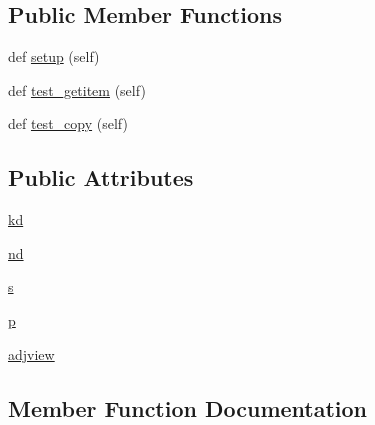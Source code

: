 \subsection*{Public Member Functions}
\begin{DoxyCompactItemize}
\item 
def \hyperlink{classnetworkx_1_1classes_1_1tests_1_1test__coreviews_1_1TestUnionMultiAdjacency_a4eed77e274d845abe9caea89699023b2}{setup} (self)
\item 
def \hyperlink{classnetworkx_1_1classes_1_1tests_1_1test__coreviews_1_1TestUnionMultiAdjacency_a1b3d33fcf85b953cb506f97f8c8a81dc}{test\+\_\+getitem} (self)
\item 
def \hyperlink{classnetworkx_1_1classes_1_1tests_1_1test__coreviews_1_1TestUnionMultiAdjacency_ab412f11245e9996f5942c3bdb4278aec}{test\+\_\+copy} (self)
\end{DoxyCompactItemize}
\subsection*{Public Attributes}
\begin{DoxyCompactItemize}
\item 
\hyperlink{classnetworkx_1_1classes_1_1tests_1_1test__coreviews_1_1TestUnionMultiAdjacency_a728e189fe2b8cae483b1bb06355f9acc}{kd}
\item 
\hyperlink{classnetworkx_1_1classes_1_1tests_1_1test__coreviews_1_1TestUnionMultiAdjacency_a8ba7bc8e8245c0966adde4ac86a34524}{nd}
\item 
\hyperlink{classnetworkx_1_1classes_1_1tests_1_1test__coreviews_1_1TestUnionMultiAdjacency_a087447b15654affd020373d2756dd403}{s}
\item 
\hyperlink{classnetworkx_1_1classes_1_1tests_1_1test__coreviews_1_1TestUnionMultiAdjacency_a4b272cf0060e3bf52f5718c40d774aeb}{p}
\item 
\hyperlink{classnetworkx_1_1classes_1_1tests_1_1test__coreviews_1_1TestUnionMultiAdjacency_ab55ab864183693aa03500853a94852b4}{adjview}
\end{DoxyCompactItemize}


\subsection{Member Function Documentation}
\mbox{\label{classnetworkx_1_1classes_1_1tests_1_1test__coreviews_1_1TestUnionMultiAdjacency_a4eed77e274d845abe9caea89699023b2}} 
